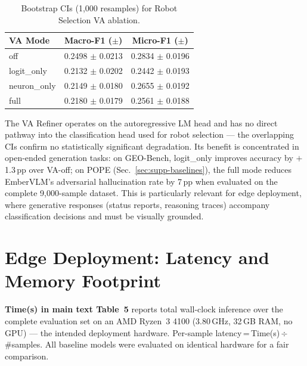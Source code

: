 \documentclass[runningheads]{llncs}
\begin{document}
\begin{table}[ht]
\centering
\caption{Bootstrap CIs (1,000 resamples) for Robot Selection VA ablation.}
\label{tab:va-ci}
\begin{tabular}{lcc}
\toprule
VA Mode & Macro-F1 ($\pm$) & Micro-F1 ($\pm$) \\
\midrule
off          & 0.2498 $\pm$ 0.0213 & 0.2834 $\pm$ 0.0196 \\
logit\_only  & 0.2132 $\pm$ 0.0202 & 0.2442 $\pm$ 0.0193 \\
neuron\_only & 0.2149 $\pm$ 0.0180 & 0.2655 $\pm$ 0.0192 \\
full         & 0.2180 $\pm$ 0.0179 & 0.2561 $\pm$ 0.0188 \\
\bottomrule
\end{tabular}
\end{table}

The VA Refiner operates on the autoregressive LM head and has no direct pathway into the classification head used for robot selection — the overlapping CIs confirm no statistically significant degradation. Its benefit is concentrated in open-ended generation tasks: on GEO-Bench, logit\_only improves accuracy by $+$1.3\,pp over VA-off; on POPE (Sec.~\ref{sec:supp-baselines}), the full mode reduces EmberVLM's adversarial hallucination rate by 7\,pp when evaluated on the complete 9,000-sample dataset. This is particularly relevant for edge deployment, where generative responses (status reports, reasoning traces) accompany classification decisions and must be visually grounded.

\section{Edge Deployment: Latency and Memory Footprint}
\label{sec:supp-latency}

\noindent\textbf{Time(s) in main text Table~5} reports total wall-clock inference over the complete evaluation set on an AMD Ryzen~3 4100 (3.80\,GHz, 32\,GB RAM, no GPU) — the intended deployment hardware. Per-sample latency\,=\,Time(s)\,$\div$\,\#samples. All baseline models were evaluated on identical hardware for a fair comparison.
\end{document}
